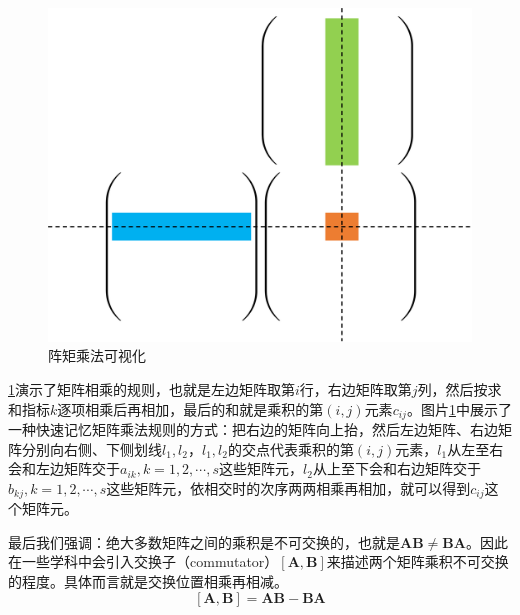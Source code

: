     \begin{figure}[htbp]
        \begin{center}
            \includegraphics[scale=0.5]{imgs/img1.png}
        \end{center}
        \caption{阵矩乘法可视化}
        \label{fig:1}
    \end{figure}

    \ref{fig:1}演示了矩阵相乘的规则，也就是左边矩阵取第$i$行，右边矩阵取第$j$列，然后按求和指标$k$逐项相乘后再相加，最后的和就是乘积的第$(i,j)$元素$c_{ij}$。图片\ref{fig:1}中展示了一种快速记忆矩阵乘法规则的方式：把右边的矩阵向上抬，然后左边矩阵、右边矩阵分别向右侧、下侧划线$l_1,l_2$，$l_1,l_2$的交点代表乘积的第$(i,j)$元素，$l_1$从左至右会和左边矩阵交于$a_{ik},k=1,2,\cdots,s$这些矩阵元，$l_2$从上至下会和右边矩阵交于$b_{kj},k=1,2,\cdots,s$这些矩阵元，依相交时的次序两两相乘再相加，就可以得到$c_{ij}$这个矩阵元。

    最后我们强调：绝大多数矩阵之间的乘积是不可交换的，也就是$\bm{A}\bm{B}\ne\bm{B}\bm{A}$。因此在一些学科中会引入交换子（commutator）$[\bm{A},\bm{B}]$来描述两个矩阵乘积不可交换的程度。具体而言就是交换位置相乘再相减。
    \begin{equation}
        \label{eq:8}
        [\bm{A},\bm{B}]=\bm{A}\bm{B}-\bm{B}\bm{A}
    \end{equation}
    
